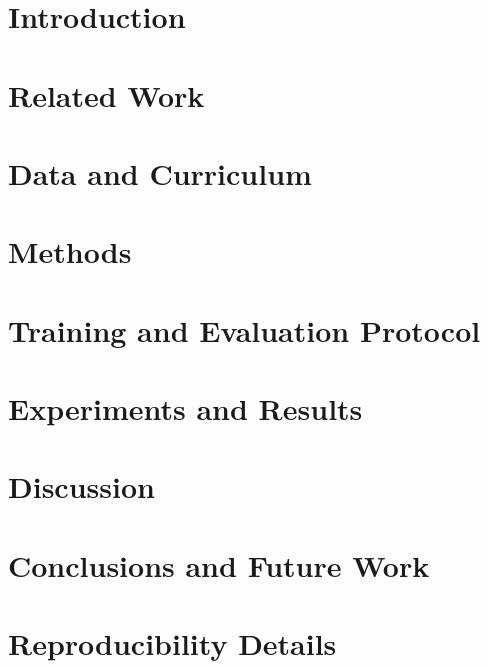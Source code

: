 \documentclass[symmetry,article,submit,pdftex]{Definitions/mdpi}
\begin{document}
\maketitle

\section{Introduction}\label{sec:intro}


\section{Related Work}\label{sec:related}


\section{Data and Curriculum}\label{sec:data}


\section{Methods}\label{sec:methods}


\section{Training and Evaluation Protocol}\label{sec:training}


\section{Experiments and Results}\label{sec:results}


\section{Discussion}\label{sec:discussion}


\section{Conclusions and Future Work}\label{sec:conclusion}


\appendix
\section{Reproducibility Details}\label{app:repro}

\end{document}
